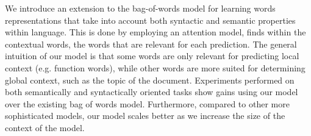 We introduce an extension to the bag-of-words model for learning words representations that take into account both syntactic and semantic properties within language. This is done by employing an attention model, finds within the contextual words, the words that are relevant for each prediction. The general intuition of our model is that some words are only relevant for predicting local context (e.g. function words), while other words are more suited for determining global context, such as the topic of the document. Experiments performed on both semantically and syntactically oriented tasks show gains using our model over the existing bag of words model. Furthermore, compared to other more sophisticated models, our model scales better as we increase the size of the context of the model.
